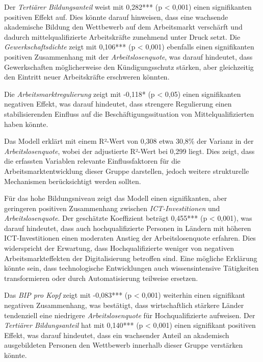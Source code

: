 Der \textit{Tertiärer Bildungsanteil} weist mit 0,282*** (p < 0,001) einen signifikanten 
positiven Effekt auf. Dies könnte darauf hinweisen, dass eine wachsende akademische 
Bildung den Wettbewerb auf dem Arbeitsmarkt verschärft und dadurch mittelqualifizierte 
Arbeitskräfte zunehmend unter Druck setzt. Die \textit{Gewerkschaftsdichte} zeigt mit 
0,106*** (p < 0,001) ebenfalls einen signifikanten positiven Zusammenhang mit der 
\textit{Arbeitslosenquote}, was darauf hindeutet, dass Gewerkschaften möglicherweise den 
Kündigungsschutz stärken, aber gleichzeitig den Eintritt neuer Arbeitskräfte erschweren 
könnten.

Die \textit{Arbeitsmarktregulierung} zeigt mit -0,118* (p < 0,05) einen signifikanten 
negativen Effekt, was darauf hindeutet, dass strengere Regulierung einen stabilisierenden 
Einfluss auf die Beschäftigungssituation von Mittelqualifizierten haben könnte. 

Das Modell erklärt mit einem R²-Wert von 0,308 etwa 30,8\% der Varianz in der 
\textit{Arbeitslosenquote}, wobei der adjustierte R²-Wert bei 0,299 liegt. Dies zeigt, 
dass die erfassten Variablen relevante Einflussfaktoren für die Arbeitsmarktentwicklung 
dieser Gruppe darstellen, jedoch weitere strukturelle Mechanismen berücksichtigt werden 
sollten.

Für das hohe Bildungsniveau zeigt das Modell einen signifikanten, aber geringeren 
positiven Zusammenhang zwischen \textit{\ac{ICT}-Investitionen} und 
\textit{Arbeitslosenquote}. Der geschätzte Koeffizient beträgt 0,455*** (p < 0,001), 
was darauf hindeutet, dass auch hochqualifizierte Personen in Ländern mit höheren 
\ac{ICT}-Investitionen einen moderaten Anstieg der Arbeitslosenquote erfahren. Dies 
widerspricht der Erwartung, dass Hochqualifizierte weniger von negativen 
Arbeitsmarkteffekten der Digitalisierung betroffen sind. Eine mögliche Erklärung könnte 
sein, dass technologische Entwicklungen auch wissensintensive Tätigkeiten transformieren 
oder durch Automatisierung teilweise ersetzen.

Das \textit{\ac{BIP} pro Kopf} zeigt mit -0,083*** (p < 0,001) weiterhin einen signifikant 
negativen Zusammenhang, was bestätigt, dass wirtschaftlich stärkere Länder tendenziell eine 
niedrigere \textit{Arbeitslosenquote} für Hochqualifizierte aufweisen. Der \textit{Tertiärer 
Bildungsanteil} hat mit 0,140*** (p < 0,001) einen signifikant positiven Effekt, was darauf 
hindeutet, dass ein wachsender Anteil an akademisch ausgebildeten Personen den Wettbewerb 
innerhalb dieser Gruppe verstärken könnte.


